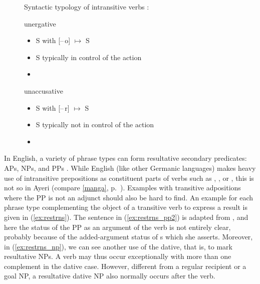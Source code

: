\begin{figure}
\pex\label{ex:verbtyp}%
Syntactic typology of intransitive verbs
\parencites{perlmutter1978}{bresnan2016}:
\a \begin{minipage}[t]{\remaining}
	unergative
	\begin{itemize}[leftmargin=*]
		\item S with [–\,o] $\mapsto$ S
		\item S typically in control of the action
		\item {}
	\end{itemize}
	\end{minipage}

\a \begin{minipage}[t]{\remaining}
	unaccusative
	\begin{itemize}[leftmargin=*]
		\item S with [–\,r] $\mapsto$ S
		\item S typically not in control of the action
		\item {}
	\end{itemize}
	\end{minipage}
\xe
\end{figure}

In English, a variety of phrase types can form resultative secondary
predicates: APs, NPs, and PPs \parencites{simpson1983}{christie2013}. While
English (like other Germanic languages) makes heavy use of intransitive
prepositions as constituent parts of verbs such as , , or , this is not so in Ayeri (compare \autoref{manga},
p.~\pageref{manga}). Examples with transitive adpositions where the PP is not
an adjunct should also be hard to find. An example for each phrase type
complementing the object of a transitive verb to express a result is given in
(\ref{ex:restrns}). The sentence in (\ref{ex:restrns_pp2}) is adapted from
\citet{christie2013}, and here the status of the PP as an argument of the verb
is not entirely clear, probably because of the added-argument status of
\XCompl{}s which she asserts. Moreover, in
(\ref{ex:restrns_np}), we can see another use of the dative, that is, to mark
resultative NPs. A verb may thus occur exceptionally with more than one
complement in the dative case. However, different from a regular recipient or
a goal NP, a resultative dative NP also normally occurs after the verb.

